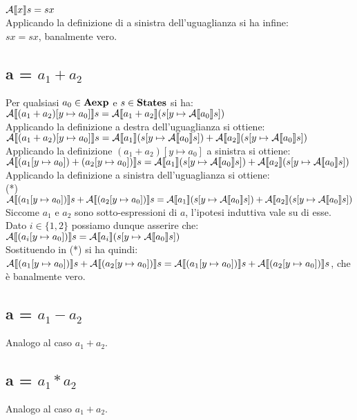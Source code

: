 {$\mathcal{A} \llbracket x \rrbracket s = s x$
\\

Applicando la definizione di  a sinistra dell'uguaglianza si ha infine:
\\

$s x = s x$,
banalmente vero.

\subsection{a = $a_1 + a_2$} Per qualsiasi $a_0 \in \textbf{Aexp}$ e $s \in \textbf{States}$ si
ha:
\\

$\mathcal{A} \llbracket (a_1 + a_2) [y \mapsto{} a_0] \rrbracket s =
\mathcal{A} \llbracket a_1 + a_2 \rrbracket (s [y \mapsto{} \mathcal{A} \llbracket a_0 \rrbracket s]) $
\\

Applicando la definizione  a destra dell'uguaglianza si ottiene:
\\

$\mathcal{A} \llbracket (a_1 + a_2) [y \mapsto{} a_0] \rrbracket s =
\mathcal{A} \llbracket a_1 \rrbracket (s [y \mapsto{} \mathcal{A} \llbracket a_0 \rrbracket s]) +
\mathcal{A} \llbracket a_2 \rrbracket (s [y \mapsto{} \mathcal{A} \llbracket a_0 \rrbracket s]) $
\\

Applicando la definizione $(a_1 + a_2)[y \mapsto{} a_0]$ a sinistra si ottiene:
\\

$\mathcal{A} \llbracket (a_1 [y \mapsto{} a_0]) + (a_2[y \mapsto{} a_0])  \rrbracket s =
\mathcal{A} \llbracket a_1 \rrbracket (s [y \mapsto{} \mathcal{A} \llbracket a_0 \rrbracket s]) +
\mathcal{A} \llbracket a_2 \rrbracket (s [y \mapsto{} \mathcal{A} \llbracket a_0 \rrbracket s]) $
\\

Applicando la definizione  a sinistra dell'uguaglianza si ottiene:
\\

(*) $\mathcal{A} \llbracket (a_1 [y \mapsto{} a_0]) \rrbracket s + \mathcal{A} \llbracket (a_2[y \mapsto{} a_0]) \rrbracket s =
\mathcal{A} \llbracket a_1 \rrbracket (s [y \mapsto{} \mathcal{A} \llbracket a_0 \rrbracket s]) +
\mathcal{A} \llbracket a_2 \rrbracket (s [y \mapsto{} \mathcal{A} \llbracket a_0 \rrbracket s]) $
\\

Siccome $a_1$ e $a_2$ sono sotto-espressioni di $a$, l'ipotesi induttiva vale
su di esse. Dato $i \in{} \{1, 2\}$ possiamo dunque asserire che:
\\

$\mathcal{A} \llbracket (a_i [y \mapsto{} a_0]) \rrbracket s =
\mathcal{A} \llbracket a_i \rrbracket (s [y \mapsto{} \mathcal{A} \llbracket a_0 \rrbracket s])$
\\

Sostituendo in (*) si ha quindi:
\\

$\mathcal{A} \llbracket (a_1 [y \mapsto{} a_0]) \rrbracket s + \mathcal{A} \llbracket (a_2[y \mapsto{} a_0])  \rrbracket s =
 \mathcal{A} \llbracket (a_1 [y \mapsto{} a_0]) \rrbracket s + \mathcal{A} \llbracket (a_2[y \mapsto{} a_0])  \rrbracket s$,
 che è banalmente vero.

}

\subsection{a = $a_1 - a_2$} Analogo al caso $a_1 + a_2$.

\subsection{a = $a_1 * a_2$} Analogo al caso $a_1 + a_2$.

